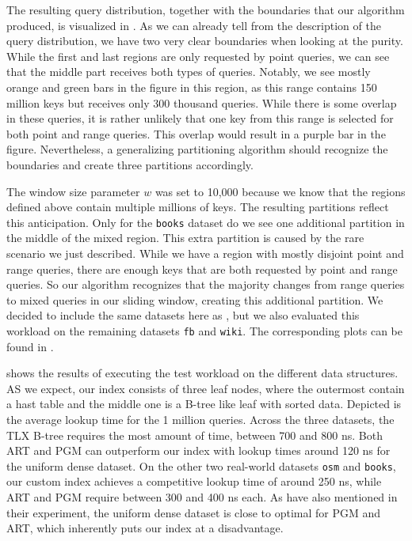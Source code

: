 The resulting query distribution, together with the boundaries that our algorithm produced, is visualized in . As we can already tell from the description of the query distribution, we have two very clear boundaries when looking at the purity. While the first and last regions are only requested by point queries, we can see that the middle part receives both types of queries. Notably, we see mostly orange and green bars in the figure in this region, as this range contains 150 million keys but receives only 300 thousand queries. While there is some overlap in these queries, it is rather unlikely that one key from this range is selected for both point and range queries. This overlap would result in a purple bar in the figure. Nevertheless, a generalizing partitioning algorithm should recognize the boundaries and create three partitions accordingly. 

The window size parameter $w$ was set to 10,000 because we know that the regions defined above contain multiple millions of keys. The resulting partitions reflect this anticipation. Only for the \verb|books| dataset do we see one additional partition in the middle of the mixed region. This extra partition is caused by the rare scenario we just described. While we have a region with mostly disjoint point and range queries, there are enough keys that are both requested by point and range queries. So our algorithm recognizes that the majority changes from range queries to mixed queries in our sliding window, creating this additional partition. We decided to include the same datasets here as \citeauthor{Dittrich2021}, but we also evaluated this workload on the remaining datasets \verb|fb| and \verb|wiki|. The corresponding plots can be found in .

 shows the results of executing the test workload on the different data structures. AS we expect, our index consists of three leaf nodes, where the outermost contain a hast table and the middle one is a B-tree like leaf with sorted data. Depicted is the average lookup time for the 1 million queries. Across the three datasets, the TLX B-tree requires the most amount of time, between 700 and 800 ns. Both ART and PGM can outperform our index with lookup times around 120 ns for the uniform dense dataset. On the other two real-world datasets \verb|osm| and \verb|books|, our custom index achieves a competitive lookup time of around 250 ns, while ART and PGM require between 300 and 400 ns each. As \citeauthor{Dittrich2021} have also mentioned in their experiment, the uniform dense dataset is close to optimal for PGM and ART, which inherently puts our index at a disadvantage.  

